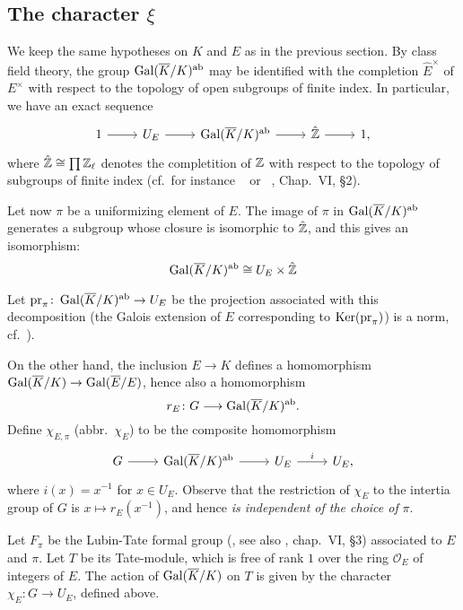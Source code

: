 \begin{subappendices}
\subsection{The character \texorpdfstring{$\xi$}{ξ}}%
\label{sec:III_A4}

We keep the same hypotheses on $K$ and $E$ as in the previous section. By class
field theory, the group $\operatorname{Gal}(\overline{K}/K)^{\mathrm{ab}}$ may be identified with the
completion $\hat{E}^\times$ of $E^\times$ with respect to the topology of open
subgroups of finite index. In particular, we have an exact sequence
\[\begin{tikzcd}
	1 \rar & U_E \rar & \abcl{\Gal(\overline{K}/K)} \rar & \hat{\Z} \rar & 1,
\end{tikzcd}\]
where $\hat{\mathbb{Z}} \cong \prod \mathbb{Z}_\ell$ denotes the completition of $\mathbb{Z}$ with
respect to the topology of subgroups of finite index (cf.\ for instance
\citeauthor{2}~\cite{2} or \citeauthor{6}~\cite{6}, Chap.~VI, \S2).

\dpage

Let now $\pi$ be a uniformizing element of $E$. The image of $\pi$ in
$\operatorname{Gal}(\overline{K}/K)^{\mathrm{ab}}$ generates a subgroup whose closure is isomorphic
to $\hat{\mathbb{Z}}$, and this gives an isomorphism:
\[
	\operatorname{Gal}(\overline{K}/K)^{\mathrm{ab}} \cong U_E \times \hat{\mathbb{Z}}
\]

Let $\operatorname{pr}_\pi \colon  \operatorname{Gal}(\overline{K}/K)^{\mathrm{ab}} \to U_E$ be the projection
associated with this decomposition (the Galois extension of $E$ corresponding to
$\operatorname{Ker}(\operatorname{pr}_\pi)$) is a norm, cf.\ \cite[144-145]{6}).

On the other hand, the inclusion $E \to K$ defines a homomorphism
$\operatorname{Gal}(\overline{K}/K) \to \operatorname{Gal}(\overline{E}/E)$, hence also a homomorphism
\[
	r_E \colon G \longrightarrow \operatorname{Gal}(\overline{K}/K)^{\mathrm{ab}}.
\]
Define $\chi_{E, \pi}$ (abbr.\ $\chi_E$) to be the composite homomorphism
\[\begin{tikzcd}
	G \rar & \abcl{\Gal(\overline{K}/K)} \rar & U_E \rar["i"] & U_E,
\end{tikzcd}\]
where $i(x) = x^{-1}$ for $x \in U_E$.
Observe that the restriction of $\chi_E$ to the intertia group of $G$ is $x
\mapsto r_E(x^{-1})$, and hence \emph{is independent of the choice of} $\pi$.

\begin{prop}
Let $F_\pi$ be the Lubin-Tate formal group (\cite{17}, see also \cite{6},
chap.~VI, \S3) associated to $E$ and $\pi$.
Let $T$ be its Tate-module, which is free of rank $1$ over the ring
$\mathcal{O}_E$ of integers of $E$.
The action of $\operatorname{Gal}(\overline{K}/K)$ on $T$ is given by the character $\chi_E
\colon G \to U_E$, defined above.
\end{prop}


\end{subappendices}
